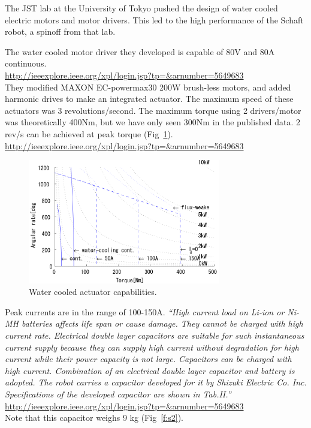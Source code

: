 \documentclass[letterpaper,12pt,fullpage]{article}
\begin{document}
The JST lab at the University of Tokyo pushed the design of water
cooled electric motors and motor drivers. This led to the high
performance of the Schaft robot, a spinoff from that lab.

The water cooled motor driver they developed is capable of 80V and
80A continuous.\\
\url{http://ieeexplore.ieee.org/xpl/login.jsp?tp=&arnumber=5649683}\\

They modified
MAXON EC-powermax30 200W brush-less motors, and added harmonic drives
to make an integrated actuator.
The maximum speed of these actuators was 3 revolutions/second.
The maximum torque using 2 drivers/motor was theoretically 400Nm, but
we have only seen 300Nm in the published data. 2 rev/s can be achieved
at peak torque (Fig~\ref{f:s1}).\\
\url{http://ieeexplore.ieee.org/xpl/login.jsp?tp=&arnumber=5649683}\\

\begin{figure}[t]
\centering
\includegraphics[width=0.75\textwidth]{tech-figs/s1}
\caption{Water cooled actuator capabilities.}
\label{f:s1}
\end{figure}

Peak currents are in the range of 100-150A.
{\it
``High current load on Li-ion or Ni-MH batteries affects life
span or cause damage. They cannot be charged with high
current rate. Electrical double layer capacitors are suitable for
such instantaneous current supply because they can supply
high current without degradation for high current while
their power capacity is not large. Capacitors can be charged
with high current. Combination of an electrical double layer
capacitor and battery is adopted. The robot carries a capacitor
developed for it by Shizuki Electric Co. Inc. Specifications of
the developed capacitor are shown in Tab.II.''}\\
\url{http://ieeexplore.ieee.org/xpl/login.jsp?tp=&arnumber=5649683}\\
Note that this capacitor weighs 9 kg (Fig~\ref{f:s2}).
\end{document}
